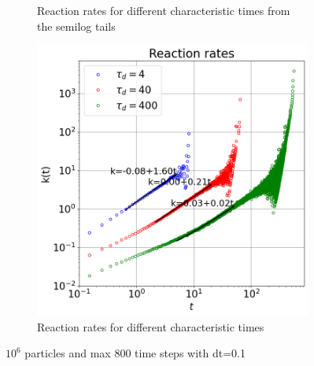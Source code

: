 \documentclass{article}
\begin{document}
\begin{figure}[htbp]
\begin{subfigure}[b]{0.48\textwidth}
        \caption{Reaction rates for different characteristic times from the semilog tails}
    \end{subfigure}
    \hfill
    \begin{subfigure}[b]{0.48\textwidth}
        \centering
        \includegraphics[width=\textwidth]{images/ratesCompareTau.png}
        \caption{Reaction rates for different characteristic times}
    \end{subfigure}
    \caption{$10^6$ particles and max 800 time steps with dt=0.1}
    \label{fig:survTimeDiffTau}
\end{figure}
\end{document}
